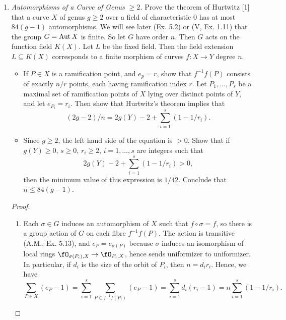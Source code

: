\documentclass[a4paper]{article}
\begin{document}
\begin{enumerate} [label=\textbf{\arabic*.}, leftmargin=0em]
  \item \textit{Automorphisms of a Curve of Genus $\geq 2$.} Prove the theorem of Hurtwitz [1] that a curve $X$ of genus $g \geq 2$ over a field of characteristic 0 has at most $84(g - 1)$ automorphisms.
        We will see later (Ex. 5.2) or (V, Ex. 1.11) that the group $G = \operatorname{Aut}{X}$ is finite.
        So let $G$ have order $n$.
        Then $G$ acts on the function field $K(X)$.
        Let $L$ be the fixed field.
        Then the field extension $L \subseteq K(X)$ corresponds to a finite morphism of curves $f : X \to Y$ degree $n$.
        \begin{itemize}
          \item[(a)] If $P \in X$ is a ramification point, and $e_p = r$, show that $f^{-1}f(P)$ consists of exactly $n/r$ points, each having ramification index $r$.
                Let $P_1, \dots, P_s$ be a maximal set of ramification points of $X$ lying over distinct points of $Y$, and let $e_{P_i} = r_i$.
                Then show that Hurtwitz's theorem implies that
                \begin{equation*}
                  (2g - 2)/n = 2g(Y) - 2 + \sum_{i = 1}^s (1 - 1/r_i).
                \end{equation*}
          \item[(b)] Since $g \geq 2$, the left hand side of the equation is $> 0$.
                Show that if $g(Y) \geq 0$, $s \geq 0$, $r_i \geq 2$, $i = 1, \dots, s$ are integers such that
                \begin{equation*}
                  2g(Y) - 2 + \sum_{i = 1}^s (1 - 1 / r_i) > 0,
                \end{equation*}
                then the minimum value of this expression is $1 / 42$.
                Conclude that $n \leq 84(g - 1)$.
        \end{itemize}

        \begin{proof} $ $ \vspace{0pt}
          \begin{enumerate} [leftmargin=0cm]
            \item[(a)] Each $\sigma \in G$ induces an automorphism of $X$ such that $f \circ \sigma = f$, so there is a group action of $G$ on each fibre $f^{-1}f(P)$.
                  The action is transitive (A.M., Ex. 5.13), and $e_P = e_{\sigma(P)}$ because $\sigma$ induces an isomorphism of local rings $\fO_{\sigma(P_i), X} \to \fO_{P_i, X}$, hence sends uniformizer to uniformizer.
                  In particular, if $d_i$ is the size of the orbit of $P_i$, then $n = d_i r_i$.
                  Hence, we have
                  \begin{equation*}
                    \sum_{P \in X} (e_P - 1) = \sum_{i = 1}^s \sum_{P \in f^{-1}f(P_i)} (e_P - 1) = \sum_{i = 1}^s d_i(r_i - 1)                      = n \sum_{i = 1}^s (1 - 1/r_i).
                  \end{equation*}


\end{enumerate}
\end{proof}
\end{enumerate}
\end{document}

